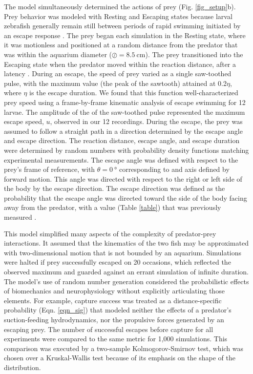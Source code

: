 \documentclass[]{rsos}%
\begin{document}
The model simultaneously determined the actions of prey (Fig. \ref{fig_setup}b).
Prey behavior was modeled with Resting and Escaping states because larval zebrafish generally remain still between periods of rapid swimming initiated by an escape response \cite{Stewart:2013bha, Stewart:2014cma}. 
The prey began each simulation in the Resting state, where it was motionless and positioned at a random distance from the predator that was within the aquarium diameter ($\oslash = \SI{8.5}{\cm}$).
The prey transitioned into the Escaping state when the predator moved within the reaction distance, after a latency \cite{Nair:2015gk}.
During an escape, the speed of prey varied as a single saw-toothed pulse, with the maximum value (the peak of the sawtooth) attained at 0.2$\eta$, where $\eta$ is the escape duration. 
We found that this function well-characterized prey speed using a frame-by-frame kinematic analysis of escape swimming for 12 larvae. 
The amplitude of the of the saw-toothed pulse represented the maximum escape speed, $u$, observed in our 12 recordings.
During the escape, the prey was assumed to follow a straight path in a direction determined by the escape angle and escape direction.
The reaction distance, escape angle, and escape duration were determined by random numbers with probability density functions matching experimental measurements.
The escape angle was defined with respect to the prey's frame of reference, with $\theta =  \SI{0}{\degree}$ corresponding to and axis defined by forward motion.
This angle was directed with respect to the right or left side of the body by the escape direction.
The escape direction was defined as the probability that the escape angle was directed toward the side of the body facing away from the predator, with a value (Table \ref{table}) that was previously measured \cite{Stewart:2014cma}.

This model simplified many aspects of the complexity of predator-prey interactions.
It assumed that the kinematics of the two fish may be approximated with two-dimensional motion that is not bounded by an aquarium. 
Simulations were halted if prey successfully escaped on 20 occasions, which reflected the observed maximum and guarded against an errant simulation of infinite duration.
The model's use of random number generation considered the probabilistic effects of biomechanics and neurophysiology without explicitly articulating those elements.
For example, capture success was treated as a distance-specific probability (Eqn. \ref{eqn_sig}) that modeled neither the effects of a predator's suction-feeding hydrodynamics, nor the propulsive forces generated by an escaping prey.
The number of successful escapes before capture for all experiments were compared to the same metric for 1,000 simulations.  
This comparison was executed by a two-sample Kolmogorov-Smirnov test, which was chosen over a Kruskal-Wallis test because of its emphasis on the shape of the distribution.  
\end{document}
